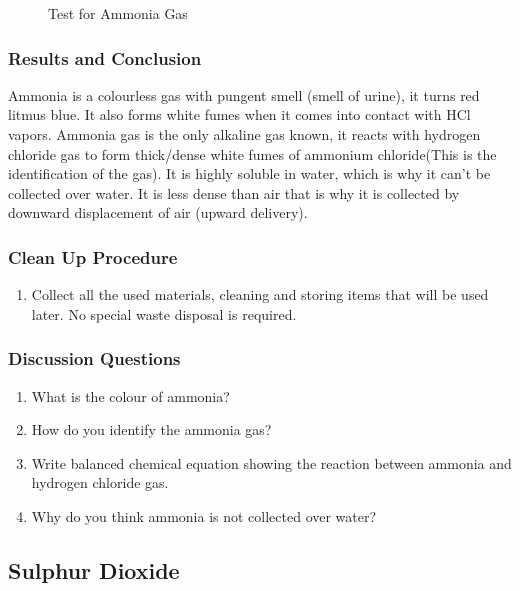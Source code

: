 \begin{figure}[h]
\begin{center}
\def\svgwidth{200pt}

\caption{Test for Ammonia Gas}
\end{center}
\end{figure}

\subsubsection*{Results and Conclusion}
Ammonia is a colourless gas with pungent smell (smell of urine), it turns red litmus blue. It also forms white fumes when it comes into contact with HCl vapors.
Ammonia gas is the only alkaline gas known, it reacts with hydrogen chloride gas to form thick/dense white fumes of ammonium chloride(This is the identification of the gas). It is highly soluble in water, which is why it can't be collected over water. It is less dense than air that is why it is collected by downward displacement of air (upward delivery).

\subsubsection*{Clean Up Procedure}
\begin{enumerate}
\item{Collect all the used materials, cleaning and storing items that will be used later. No special waste disposal is required.}
\end{enumerate}

\subsubsection*{Discussion Questions}
\begin{enumerate}
\item{What is the colour of ammonia?}
\item{How do you identify the ammonia gas?}
\item{Write balanced chemical equation showing the reaction between ammonia and hydrogen chloride gas.}
\item{Why do you think ammonia is not collected over water?}
\end{enumerate}

\subsection{Sulphur Dioxide}


